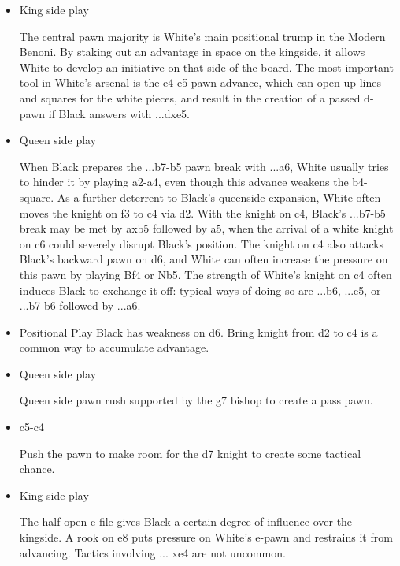\begin{itemize}
    \item{King side play \cite{url:wiki_modern_benoni}}

    The central pawn majority is White's main positional trump in the Modern Benoni. By staking out an advantage in space on the kingside, it allows White to develop an initiative on that side of the board. The most important tool in White's arsenal is the e4-e5 pawn advance, which can open up lines and squares for the white pieces, and result in the creation of a passed d-pawn if Black answers with ...dxe5.
    \item{Queen side play \cite{url:wiki_modern_benoni}}

    When Black prepares the ...b7-b5 pawn break with ...a6, White usually tries to hinder it by playing a2-a4, even though this advance weakens the b4-square. As a further deterrent to Black's queenside expansion, White often moves the knight on f3 to c4 via d2. With the knight on c4, Black's ...b7-b5 break may be met by axb5 followed by \symknight{}a5, when the arrival of a white knight on c6 could severely disrupt Black's position. The knight on c4 also attacks Black's backward pawn on d6, and White can often increase the pressure on this pawn by playing Bf4 or Nb5. The strength of White's knight on c4 often induces Black to exchange it off: typical ways of doing so are ...\symknight{}b6, ...\symknight{}e5, or ...b7-b6 followed by ...\symbishop{}a6.

    \item{Positional Play}
    Black has weakness on d6. Bring knight from d2 to c4 is a common way to accumulate advantage.

\end{itemize}    

\begin{itemize}
    \item{Queen side play }

    Queen side pawn rush supported by the g7 bishop to create a pass pawn. 

    \item{c5-c4}

    Push the pawn to make room for the d7 knight to create some tactical chance.
    \item{King side play}

    The half-open e-file gives Black a certain degree of influence over the kingside. A rook on e8 puts pressure on White's e-pawn and restrains it from advancing. Tactics involving ...\symknight{} xe4 are not uncommon.
\end{itemize} 



